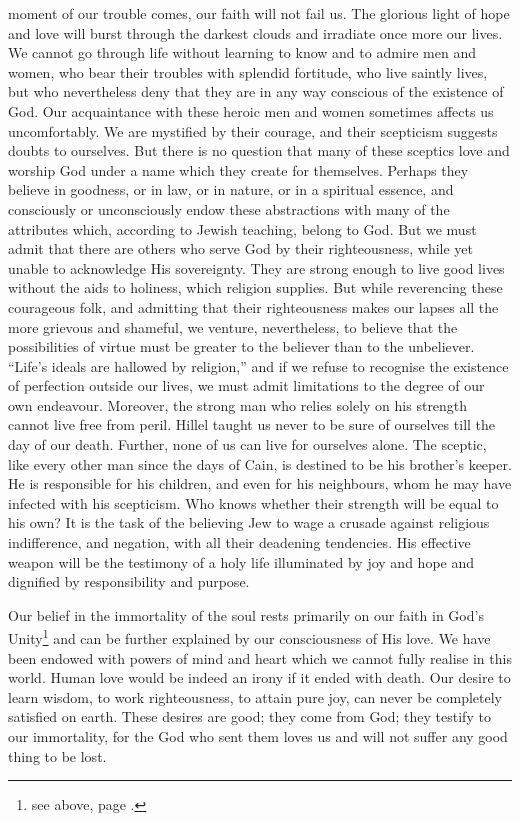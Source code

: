 moment of our trouble comes, our faith will
not fail us. The glorious light of hope and
love will burst through the darkest clouds
and irradiate once more our lives. We
cannot go through life without learning to
know and to admire men and women, who
bear their troubles with splendid fortitude,
who live saintly lives, but who nevertheless
deny that they are in any way conscious of
the existence of God. Our acquaintance
with these heroic men and women sometimes
affects us uncomfortably. We are
mystified by their courage, and their
scepticism suggests doubts to ourselves.
But there is no question that many of these
sceptics love and worship God under a name
which they create for themselves. Perhaps
they believe in goodness, or in law, or in
nature, or in a spiritual essence, and
consciously or unconsciously endow these
abstractions with many of the attributes
which, according to Jewish teaching, belong
to God. But we must admit that there are
others who serve God by their righteousness,
while yet unable to acknowledge His
sovereignty. They are strong enough to
live good lives without the aids to holiness,
which religion supplies. But while reverencing
these courageous folk, and admitting
that their righteousness makes our lapses
all the more grievous and shameful, we
venture, nevertheless, to believe that the
possibilities of virtue must be greater to
the believer than to the unbeliever. “Life’s
ideals are hallowed by religion,” and if we
refuse to recognise the existence of
perfection outside our lives, we must admit
limitations to the degree of our own
endeavour. Moreover, the strong man who
relies solely on his strength cannot live free
from peril. Hillel taught us never to be
sure of ourselves till the day of our death.
Further, none of us can live for ourselves
alone. The sceptic, like every other man
since the days of Cain, is destined to be
his brother’s keeper. He is responsible for
his children, and even for his neighbours,
whom he may have infected with his
scepticism. Who knows whether their
strength will be equal to his own? It is
the task of the believing Jew to wage a
crusade against religious indifference, and
negation, with all their deadening tendencies.
His effective weapon will be the testimony
of a holy life illuminated by joy and hope
and dignified by responsibility and purpose.

Our belief in the immortality of the soul
rests primarily on our faith in God’s Unity\footnote{see above,
page \pageref{unity}.}
and can be further explained by our
consciousness of His love. We have been
endowed with powers of mind and heart
which we cannot fully realise in this world.
Human love would be indeed an irony if
it ended with death. Our desire to learn
wisdom, to work righteousness, to attain
pure joy, can never be completely satisfied
on earth. These desires are good; they
come from God; they testify to our immortality,
for the God who sent them loves
us and will not suffer any good thing to
be lost.

